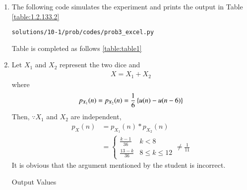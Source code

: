 \begin{enumerate}
\item The following code simulates the experiment and prints the output in Table \ref{table:1.2.133.2}	

\begin{lstlisting}
solutions/10-1/prob/codes/prob3_excel.py
\end{lstlisting}

Table is completed as follows \ref{table:table1}
%
\item 
Let $X_1$ and $X_2$ represent the two dice and 
\begin{align}
X = X_1 + X_2
\end{align}
where 
\begin{align}
p_{X_1}(n) = p_{X_2}(n) = \frac{1}{6} \left\{u(n)-u(n-6)\right\}
\end{align}
Then, $\because X_1$ and $X_2$ are independent, 
\begin{align}
p_{X}(n) &= p_{X_1}(n)*p_{X_2}(n)
\\
&= 
\begin{cases}
\frac{k-1}{36} & k < 8
\\
\frac{13-k}{36} & 8 \le k \le 12
\end{cases}
\ne \frac{1}{11}
\end{align}
It is obvious that the argument mentioned by the student is incorrect.
\begin{table}[ht!]
\centering

\caption{Output Values}
\label{table:1.2.13.2}	
\end{table}

\end{enumerate}
